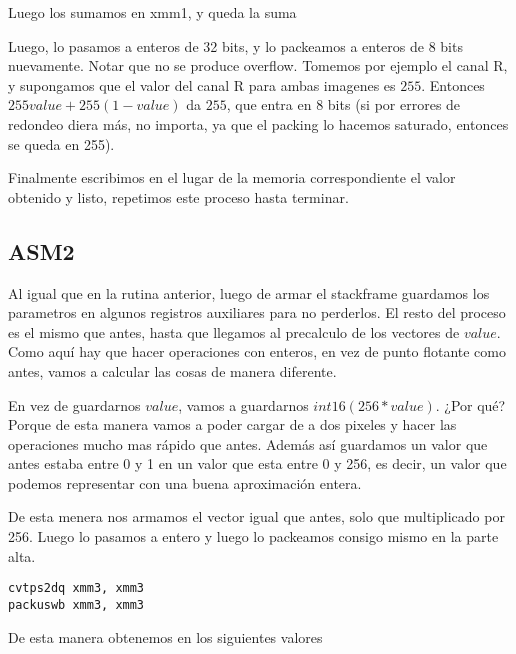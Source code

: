 

Luego los sumamos en xmm1, y queda la suma


Luego, lo pasamos a enteros de 32 bits, y lo packeamos a enteros de 8 bits nuevamente. 
Notar que no se produce overflow. Tomemos por ejemplo el canal R, y supongamos que el valor del canal R para ambas imagenes es $255$.
Entonces $255value + 255(1-value)$ da $255$, que entra en 8 bits (si por errores de redondeo diera más, no importa, ya que el packing lo hacemos saturado, entonces se queda en 255).

Finalmente escribimos en el lugar de la memoria correspondiente el valor obtenido y listo, repetimos este proceso hasta terminar.


\subsection{ASM2}

Al igual que en la rutina anterior, luego de armar el stackframe guardamos los parametros en algunos registros auxiliares para no perderlos. El resto del proceso es el mismo que antes, hasta que llegamos al precalculo de los vectores de $value$. Como aquí hay que hacer operaciones con enteros, en vez de punto flotante como antes, vamos a calcular las cosas de manera diferente.

En vez de guardarnos $value$, vamos a guardarnos $int16(256*value)$. ¿Por qué? Porque de esta manera vamos a poder cargar de a dos pixeles y hacer las operaciones mucho mas rápido que antes. Además así guardamos un valor que antes estaba entre 0 y 1 en un valor que esta entre 0 y 256, es decir, un valor que podemos representar con una buena aproximación entera.

De esta menera nos armamos el vector igual que antes, solo que multiplicado por 256. Luego lo pasamos a entero y luego lo packeamos consigo mismo en la parte alta.
\begin{lstlisting}
cvtps2dq xmm3, xmm3
packuswb xmm3, xmm3
\end{lstlisting}


De esta manera obtenemos en  los siguientes valores

